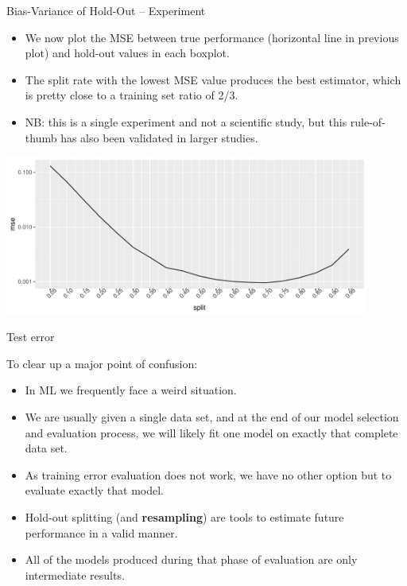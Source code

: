 \documentclass[11pt,compress,t,notes=noshow, xcolor=table]{beamer}
\begin{document}
\begin{vbframe}{Bias-Variance of Hold-Out -- Experiment}
\framebreak

\begin{itemize}
  \item We now plot the MSE between true performance (horizontal line in 
  previous plot) and hold-out values in each boxplot.
  \item The split rate with the lowest MSE value produces the best estimator, 
  which is pretty close to a training set ratio of 2/3.
  \item NB: this is a single experiment and not a scientific study, but this 
  rule-of-thumb has also been validated in larger studies.
\end{itemize}

\begin{center}
  \includegraphics[width=0.9\textwidth]{figure/test-holdout-example-2} 
\end{center}

\end{vbframe}


\begin{vbframe}{Test error}

To clear up a major point of confusion:
\medskip

\begin{itemize}
  \item In ML we frequently face a weird situation.
  \item We are usually given a single data set, and at the end of our model 
  selection and evaluation process, we will likely fit one model on exactly that 
  complete data set. 
  \item As training error evaluation does not work, we have no other option but 
  to evaluate exactly that model.
  \item Hold-out splitting (and \textbf{resampling}) are tools to estimate 
  future performance in a valid manner. 
  \item All of the models produced during that phase of evaluation are only
  intermediate results.
\end{itemize}

\end{vbframe}


\endlecture
\end{document}
